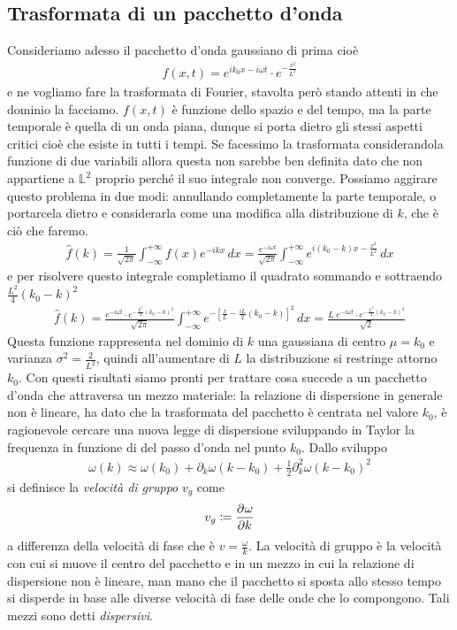 \subsection{Trasformata di un pacchetto d'onda}
Consideriamo adesso il pacchetto d'onda gaussiano di prima cioè 
\begin{align}
  f(x,t) = e^{i k_0 x - i\omega t} \cdot e^{- \frac{x^2}{L^2}}
\end{align}
e ne vogliamo fare la trasformata di Fourier, stavolta però stando attenti in che dominio la facciamo. $ f(x,t) $ è funzione dello spazio e del tempo, ma la 
parte temporale è quella di un onda piana, dunque si porta dietro gli stessi aspetti critici cioè che esiste in tutti i tempi. Se facessimo la trasformata 
considerandola funzione di due variabili allora questa non sarebbe ben definita dato che non appartiene a $ \mathbb{L}^2 $ proprio perché il suo integrale non 
converge. Possiamo aggirare questo problema in due modi: annullando completamente la parte temporale, o portarcela dietro e considerarla come una modifica 
alla distribuzione di $ k $, che è ciò che faremo.
\begin{align}
  \hat{f}(k) = \frac{1}{\sqrt{2\pi}} \int_{-\infty}^{+\infty} f(x) e^{-ikx} \,dx =
  \frac{e^{-i\omega t}}{\sqrt{2\pi}} \int_{-\infty}^{+\infty} e^{i(k_0 - k)x - \frac{x^2}{L^2}} \,dx
\end{align}
e per risolvere questo integrale completiamo il quadrato sommando e sottraendo $ \frac{L^2}{4} (k_0 - k)^2 $
\begin{align}
  \hat{f}(k) = \frac{e^{-i\omega t}\cdot e^{-\frac{L^2}{4}(k_0 - k)^2}}{\sqrt{2\pi}} \int_{-\infty}^{+\infty} 
  e^{-\left[ \frac{x}{L} - \frac{iL}{2}(k_0 - k) \right]^2} \,dx = \frac{L\;e^{-i\omega t}\cdot e^{-\frac{L^2}{4}(k_0 - k)^2}}{\sqrt{2}}
\end{align}
Questa funzione rappresenta nel dominio di $ k $ una gaussiana di centro $ \mu = k_0 $ e varianza $ \sigma^2 = \frac{2}{L^2} $, quindi all'aumentare di 
$ L $ la distribuzione si restringe attorno $ k_0 $. Con questi risultati siamo pronti per trattare cosa succede a un pacchetto d'onda che attraversa un 
mezzo materiale: la relazione di dispersione in generale non è lineare, ha dato che la trasformata del pacchetto è centrata nel valore $ k_0 $, è 
ragionevole cercare una nuova legge di dispersione sviluppando in Taylor la frequenza in funzione di del passo d'onda nel punto $ k_0 $. Dallo sviluppo
\begin{align}
  \omega(k) \approx \omega(k_0) + \partial_k \omega (k-k_0) + \frac{1}{2} \partial_k^2 \omega (k-k_0)^2
\end{align}
si definisce la \textit{velocità di gruppo} $ v_g $ come
\begin{align}
  v_g \coloneqq \frac{\partial^{} {\omega}}{\partial {k}^{}}
\end{align}
a differenza della velocità di fase che è $ v = \frac{\omega}{k} $. La velocità di gruppo è la velocità con cui si muove il centro del pacchetto e
in un mezzo in cui la relazione di dispersione non è lineare, man mano che il pacchetto si sposta allo stesso tempo si disperde in base alle diverse 
velocità di fase delle onde che lo compongono. Tali mezzi sono detti \textit{dispersivi}.


